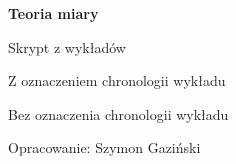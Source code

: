\begin{titlepage}
  \thispagestyle{empty}
  \null
\end{titlepage}

\begin{titlepage}
  \thispagestyle{empty}
  \centering
  \vspace*{\fill}
  {\LARGE\bfseries Teoria miary\par}
  \vspace{0.7cm}
  {\large Skrypt z wykładów\par}
  \vspace{0.35cm}
  \ifchronologia
    {\normalsize Z oznaczeniem chronologii wykładu\par}
  \else
    {\normalsize Bez oznaczenia chronologii wykładu\par}
  \fi
  \vspace{1.3cm}
  {\large Opracowanie: Szymon Gaziński\par}
  \vspace*{\fill}
\end{titlepage}
